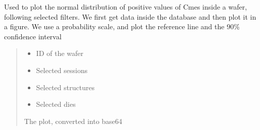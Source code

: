 \documentclass[letterpaper,10pt,english]{sphinxmanual}
\begin{document}
\begin{fulllineitems}
\label{\detokenize{normal_plots:normal_plots.Cmes_normal_distrib_pos}}
\pysigstartsignatures
{}
\pysigstopsignatures
\sphinxAtStartPar
Used to plot the normal distribution of positive values of Cmes inside a wafer, following selected filters.
We first get data inside the database and then plot it in a figure. We use a probability scale, and plot the reference line and the 90\% confidence interval
\begin{quote}\begin{description}
\begin{itemize}
\item {} 
\sphinxAtStartPar
{} \textendash{} ID of the wafer

\item {} 
\sphinxAtStartPar
{} \textendash{} Selected sessions

\item {} 
\sphinxAtStartPar
{} \textendash{} Selected structures

\item {} 
\sphinxAtStartPar
{} \textendash{} Selected dies

\end{itemize}

\sphinxAtStartPar
The plot, converted into base64

\end{description}\end{quote}

\end{fulllineitems}

\end{document}
